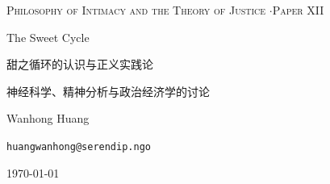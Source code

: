 \documentclass[11pt,a4paper]{article}
\begin{document}
\thispagestyle{empty}
\null\vfill
\begin{center}
{\footnotesize\color{rosedeep}\scshape Philosophy of Intimacy and the Theory of Justice \quad$\cdot$\quad Paper XII\par}
\vspace{0.9em}
\coverrule\par
\vspace{1.6em}
{\color{warnred}\Large The Sweet Cycle\par}
\vspace{0.5em}
{\color{warnred}\cjkfont\large 甜之循环的认识与正义实践论\par}
\vspace{0.25em}
{\color{rose}\cjkfont\normalsize 神经科学、精神分析与政治经济学的讨论\par}
\vspace{2.4em}
\coverrule[0.25]\par
\vspace{1.4em}
{\large Wanhong Huang\par}
\vspace{0.5em}
{\footnotesize \texttt{huangwanhong@serendip.ngo}\par}
\vspace{1.2em}
{\today\par}
\end{center}
\vfill\null
\coverfootnote
\clearpage
\end{document}
